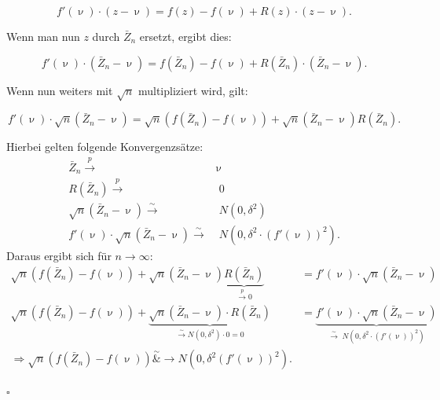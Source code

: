 \documentclass[10pt]{article}
\newcommand{\KW}{\overset{p} \longrightarrow} %
\newcommand{\KV}{\overset{\sim} \longrightarrow} %
\newenvironment{BWS}[1][]
{\begin{Beweis}[frametitle=#1]}{\end{Beweis}}
\begin{document}
\begin{BWS}[Beweis 1.3.1 Delta-Methode]
		\begin{equation*}
			f'(\upnu) \cdot (z-\upnu) = f(z) - f(\upnu) + R(z) \cdot (z-\upnu).
		\end{equation*}
		
		Wenn man nun $z$ durch $\bar{Z}_n$ ersetzt, ergibt dies:
		
		
		\begin{equation*}
			f'(\upnu) \cdot (\bar{Z}_n-\upnu) = f(\bar{Z}_n) - f(\upnu) + R(\bar{Z}_n) \cdot (\bar{Z}_n-\upnu).			
		\end{equation*}
		
		Wenn nun weiters mit $\sqrt{n}$ multipliziert wird, gilt:
		
		\begin{equation*}
			f'(\upnu) \cdot\sqrt{n} (\bar{Z}_n-\upnu) = \sqrt{n}(f(\bar{Z}_n) - f(\upnu)) + \sqrt{n} (\bar{Z}_n-\upnu)	R(\bar{Z}_n).
		\end{equation*}
		
		Hierbei gelten folgende Konvergenzsätze:
		\begin{equation*}
			\begin{split}
			\bar{Z}_n \KW& \upnu\\
			R(\bar{Z}_n) \KW& \;0\\
			\sqrt{n} (\bar{Z}_n-\upnu) \KV& \;N(0,\delta^2)\\
			f'(\upnu) \cdot\sqrt{n} (\bar{Z}_n-\upnu) \KV& \;N(0,\delta^2 \cdot (f'(\upnu))^2).
			\end{split}
		\end{equation*}
		Daraus ergibt sich für $n \rightarrow \infty$: 
		\begin{equation*}
			\begin{split}
				\sqrt{n}(f(\bar{Z}_n) - f(\upnu)) + \sqrt{n} (\bar{Z}_n-\upnu)	\underbrace{R(\bar{Z}_n)}_{\overset{p}{\rightarrow} 0} &= f'(\upnu) \cdot\sqrt{n} (\bar{Z}_n-\upnu) \\
				\sqrt{n}(f(\bar{Z}_n) - f(\upnu)) + \underbrace{\sqrt{n} (\bar{Z}_n-\upnu) \cdot R(\bar{Z}_n)}_{\overset{\sim}{\rightarrow}N(0, \delta^2) \cdot 0 = 0} &= \underbrace{f'(\upnu) \cdot\sqrt{n} (\bar{Z}_n-\upnu)}_{\KV \;N(0,\delta^2 \cdot (f'(\upnu))^2)} \\
				\Longrightarrow \sqrt{n} (f(\bar{Z}_n) - f(\upnu)) \overset{\sim}&{\rightarrow} N(0, \delta^2 (f'(\upnu))^2).
			\end{split}
		\end{equation*}
		\begin{flushright}
			$\square$
		\end{flushright}
		
	\end{BWS}
	
\end{document}
